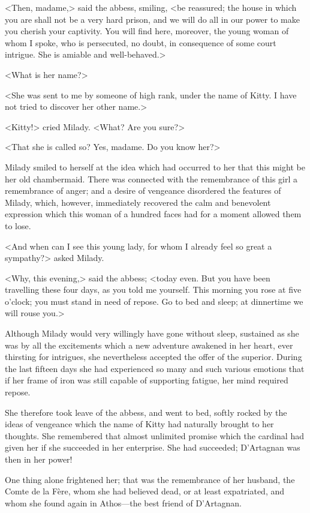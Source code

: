 <Then, madame,> said the abbess, smiling, <be reassured; the house in which you are shall not be a very hard prison, and we will do all in our power to make you cherish your captivity. You will find here, moreover, the young woman of whom I spoke, who is persecuted, no doubt, in consequence of some court intrigue. She is amiable and well-behaved.> 

<What is her name?> 

<She was sent to me by someone of high rank, under the name of Kitty. I have not tried to discover her other name.> 

<Kitty!> cried Milady. <What? Are you sure?> 

<That she is called so? Yes, madame. Do you know her?> 

Milady smiled to herself at the idea which had occurred to her that this might be her old chambermaid. There was connected with the remembrance of this girl a remembrance of anger; and a desire of vengeance disordered the features of Milady, which, however, immediately recovered the calm and benevolent expression which this woman of a hundred faces had for a moment allowed them to lose. 

<And when can I see this young lady, for whom I already feel so great a sympathy?> asked Milady. 

<Why, this evening,> said the abbess; <today even. But you have been travelling these four days, as you told me yourself. This morning you rose at five o'clock; you must stand in need of repose. Go to bed and sleep; at dinnertime we will rouse you.> 

Although Milady would very willingly have gone without sleep, sustained as she was by all the excitements which a new adventure awakened in her heart, ever thirsting for intrigues, she nevertheless accepted the offer of the superior. During the last fifteen days she had experienced so many and such various emotions that if her frame of iron was still capable of supporting fatigue, her mind required repose. 

She therefore took leave of the abbess, and went to bed, softly rocked by the ideas of vengeance which the name of Kitty had naturally brought to her thoughts. She remembered that almost unlimited promise which the cardinal had given her if she succeeded in her enterprise. She had succeeded; D'Artagnan was then in her power! 

One thing alone frightened her; that was the remembrance of her husband, the Comte de la Fère, whom she had believed dead, or at least expatriated, and whom she found again in Athos—the best friend of D'Artagnan. 

